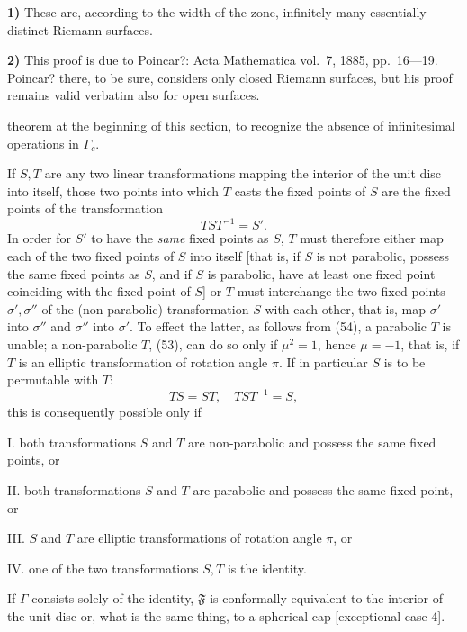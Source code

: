 \documentclass{article}
\begin{document}
\textbf{1)} These are, according to the width of the zone, infinitely many essentially distinct Riemann surfaces.

\textbf{2)} This proof is due to Poincar?: Acta Mathematica vol.~7, 1885, pp.~16---19. Poincar? there, to be sure, considers only closed Riemann surfaces, but his proof remains valid verbatim also for open surfaces.

theorem at the beginning of this section, to recognize the absence of infinitesimal operations in $\varGamma_c$.

If $S, T$ are any two linear transformations mapping the interior of the unit disc into itself, those two points into which $T$ casts the fixed points of $S$ are the fixed points of the transformation
\[ TST^{-1} = S'. \]
In order for $S'$ to have the \emph{same} fixed points as $S$, $T$ must therefore either map each of the two fixed points of $S$ into itself [that is, if $S$ is not parabolic, possess the same fixed points as $S$, and if $S$ is parabolic, have at least one fixed point coinciding with the fixed point of $S$] or $T$ must interchange the two fixed points $\sigma', \sigma''$ of the (non-parabolic) transformation $S$ with each other, that is, map $\sigma'$ into $\sigma''$ and $\sigma''$ into $\sigma'$. To effect the latter, as follows from (54), a parabolic $T$ is unable; a non-parabolic $T$, (53), can do so only if $\mu^2 = 1$, hence $\mu = -1$, that is, if $T$ is an elliptic transformation of rotation angle $\pi$. If in particular $S$ is to be permutable with $T$:
\[ TS = ST, \quad TST^{-1} = S, \]
this is consequently possible only if

I. both transformations $S$ and $T$ are non-parabolic and possess the same fixed points, or

II. both transformations $S$ and $T$ are parabolic and possess the same fixed point, or

III. $S$ and $T$ are elliptic transformations of rotation angle $\pi$, or

IV. one of the two transformations $S, T$ is the identity.

If $\varGamma$ consists solely of the identity, $\mathfrak{F}$ is conformally equivalent to the interior of the unit disc or, what is the same thing, to a spherical cap [exceptional case 4].
\end{document}

